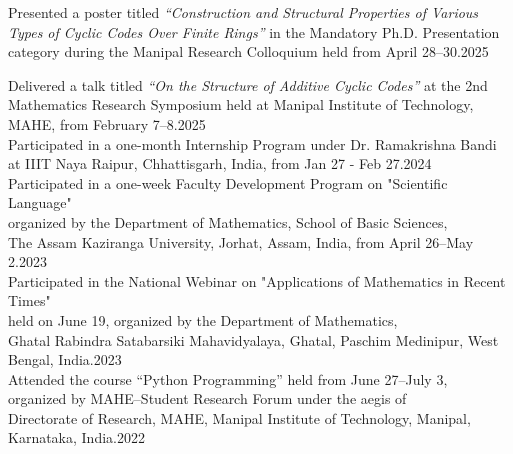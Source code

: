 \documentclass[
	a4paper,
	sidecolor=gray!50,
	sectioncolor=materialblue,
	subsectioncolor=materialindigo,
	profilepicsize=3.5cm,
	profilepicstyle=profilecircle,
	profilepiczoom=1.1,
]{sixtysecondscv}
\begin{document}
\vspace{2mm}
\begin{cvtable}
{Presented a poster titled \textit{“Construction and Structural Properties of Various Types of Cyclic Codes Over Finite Rings”} in the Mandatory Ph.D. Presentation category during the Manipal Research Colloquium held from April 28--30.}{2025}\\

\end{cvtable}
\begin{cvtable}

{Delivered a talk titled \textit{“On the Structure of Additive Cyclic Codes”} at the 2nd Mathematics Research Symposium held at Manipal Institute of Technology, MAHE, from February 7--8.}{2025}\\

{Participated in a one-month Internship Program under Dr. Ramakrishna Bandi\\
at IIIT Naya Raipur, Chhattisgarh, India, from Jan 27 - Feb 27.}{2024}\\
        
{Participated in a one-week Faculty Development Program on "Scientific Language"\\
organized by the Department of Mathematics, School of Basic Sciences,\\
The Assam Kaziranga University, Jorhat, Assam, India, from April 26--May 2.}{2023}\\

{Participated in the National Webinar on "Applications of Mathematics in Recent Times"\\
held on June 19, organized by the Department of Mathematics,\\
Ghatal Rabindra Satabarsiki Mahavidyalaya, Ghatal, Paschim Medinipur, West Bengal, India.}{2023}\\

{Attended the course “Python Programming” held from June 27--July 3,\\
organized by MAHE–Student Research Forum under the aegis of\\
Directorate of Research, MAHE, Manipal Institute of Technology, Manipal, Karnataka, India.}{2022}\\
\end{cvtable}
\end{document}
